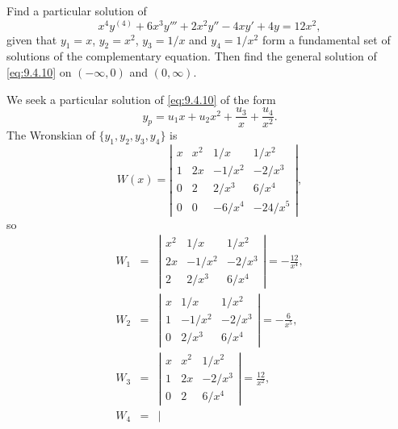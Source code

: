 \setcounter{example}{1}
\setcounter{equation}{9}
\begin{example}
  \label{example:9.4.2} \rm Find a particular solution of
  \begin{equation}
    \label{eq:9.4.10}x^{4}y^{(4)}+6x^{3}y'''+2x^{2}y''-4xy'+4y=12x^{2},
  \end{equation}
  given that $y_{1}=x$, $y_{2}=x^{2}$, $y_{3}=1/x$ and $y_{4}=1/x^{2}$ form a fundamental set of
  solutions of the complementary equation. Then find the general solution of \eqref{eq:9.4.10} on
  $(-\infty,0)$ and $(0,\infty)$.
\end{example}
\begin{examplesolution}
\solution We seek a particular solution of \eqref{eq:9.4.10} of the form
\[
  y_{p}=u_{1}x+u_{2}x^{2}+\frac{u_{3}}{x}+\frac{u_{4}}{x^{2}}.
\]
The Wronskian of $\{y_{1},y_{2},y_{3},y_{4}\}$ is
\[
  W(x)=\left|
  \begin{array}{cccr}
    x & x^{2} & 1/x      & 1/x^{2}   \\[5pt]
    1 & 2x    & -1/x^{2} & -2/x^{3}  \\[5pt]
    0 & 2     & 2/x^{3}  & 6/x^{4}   \\[5pt]
    0 & 0     & -6/x^{4} & -24/x^{5}
  \end{array}\right|,
\]
so
\begin{eqnarray*}
  W_{1}&=& \left|
  \begin{array}{ccr}
    x^{2} & 1/x      & 1/x^{2}  \\[5pt]
    2x    & -1/x^{2} & -2/x^{3} \\[5pt]
    2     & 2/x^{3}  & 6/x^{4}
  \end{array}\right|=-\frac{12}{x^{4}},\\[10pt] W_{2}&=& \left|
  \begin{array}{ccr}
    x & 1/x      & 1/x^{2}  \\[5pt]
    1 & -1/x^{2} & -2/x^{3} \\[5pt]
    0 & 2/x^{3}  & 6/x^{4}
  \end{array}\right|=-\frac{6}{x^{5}},\\[10pt] W_{3}&=& \left|
  \begin{array}{ccc}
    x & x^{2} & 1/x^{2}  \\[5pt]
    1 & 2x    & -2/x^{3} \\[5pt]
    0 & 2     & 6/x^{4}
  \end{array}\right|=\frac{12}{x^{2}},\\ W_{4}&=& \left|
  \begin{array}{ccc}

\end{array}
\end{eqnarray*}
\end{examplesolution}
